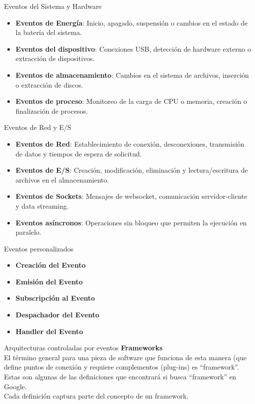 \documentclass[11pt]{beamer}
\begin{document}
	\begin{frame}{Eventos del Sistema y Hardware}
		\begin{itemize}
			\item \textbf{Eventos de Energía}: Inicio, apagado, suspensión o cambios en el estado de la batería del sistema.
			\item \textbf{Eventos del dispositivo}: Conexiones USB, detección de hardware externo o extracción de dispositivos.
			\item \textbf{Eventos de almacenamiento}: Cambios en el sistema de archivos, inserción o extracción de discos.
			\item \textbf{Eventos de proceso}: Monitoreo de la carga de CPU o memoria, creación o finalización de procesos.
		\end{itemize}	
	\end{frame}
	
	\begin{frame}{Eventos de Red y E/S}
		\begin{itemize}
			\item \textbf{Eventos de Red}: Establecimiento de conexión, desconexiones, transmisión de datos y tiempos de espera de solicitud.
			\item \textbf{Eventos de E/S}: Creación, modificación, eliminación y lectura/escritura de archivos en el almacenamiento.
			\item \textbf{Eventos de Sockets}: Mensajes de websocket, comunicación servidor-cliente y data streaming.
			\item \textbf{Eventos asíncronos}: Operaciones sin bloqueo que permiten la ejecución en paralelo.
		\end{itemize}	
	\end{frame}
	
	\begin{frame}{Eventos personalizados}
		\begin{itemize}
			\item \textbf{Creación del Evento}
			\item \textbf{Emisión del Evento}
			\item \textbf{Subscripción al Evento}
			\item \textbf{Despachador del Evento}
			\item \textbf{Handler del Evento}
		\end{itemize}	
	\end{frame}
	
	\begin{frame}{Arquitecturas controladas por eventos}
		\textbf{Frameworks}\newline
		\\El término general para una pieza de software que funciona de esta manera (que define puntos de conexión y requiere complementos (plug-ins) es ``framework''. Estas son algunas de las definiciones que encontrará si busca ``framework'' en Google. \\Cada definición captura parte del concepto de un framework. 
		
	\end{frame}
	
\end{document}
